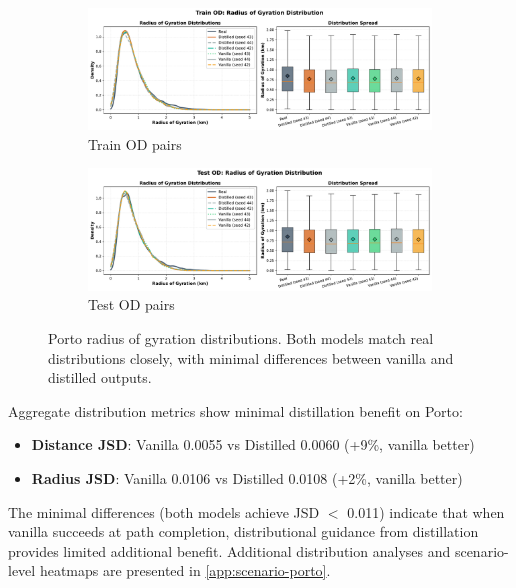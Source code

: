 \begin{figure}[t]
    \centering
    \begin{subfigure}{0.49\linewidth}
        \centering
        \includegraphics[width=\linewidth]{assets/plots/eval/porto/distributions/radius_distribution_train_od.pdf}
        \caption{Train OD pairs}
    \end{subfigure}
    \begin{subfigure}{0.49\linewidth}
        \centering
        \includegraphics[width=\linewidth]{assets/plots/eval/porto/distributions/radius_distribution_test_od.pdf}
        \caption{Test OD pairs}
    \end{subfigure}
    \caption{Porto radius of gyration distributions. Both models match real distributions closely, with minimal differences between vanilla and distilled outputs.}
    \label{fig:porto-radius-distributions}
\end{figure}

Aggregate distribution metrics show minimal distillation benefit on Porto:
\begin{itemize}[leftmargin=*,noitemsep]
    \item \textbf{Distance JSD}: Vanilla 0.0055 vs Distilled 0.0060 (+9\%, vanilla better)
    \item \textbf{Radius JSD}: Vanilla 0.0106 vs Distilled 0.0108 (+2\%, vanilla better)
\end{itemize}

The minimal differences (both models achieve JSD $<$ 0.011) indicate that when vanilla succeeds at path completion, distributional guidance from distillation provides limited additional benefit. Additional distribution analyses and scenario-level heatmaps are presented in \autoref{app:scenario-porto}.

